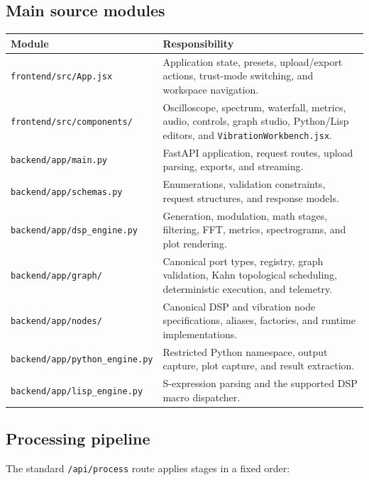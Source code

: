 \documentclass[10pt,a4paper]{article}
\newcommand{\code}[1]{\nolinkurl{#1}}
\begin{document}
\subsection{Main source modules}

\begin{tabularx}{\textwidth}{L{4.1cm}Y}
\toprule
Module & Responsibility\\
\midrule
\code{frontend/src/App.jsx} & Application state, presets, upload/export actions, trust-mode switching, and workspace navigation.\\
\code{frontend/src/components/} & Oscilloscope, spectrum, waterfall, metrics, audio, controls, graph studio, Python/Lisp editors, and \code{VibrationWorkbench.jsx}.\\
\code{backend/app/main.py} & FastAPI application, request routes, upload parsing, exports, and streaming.\\
\code{backend/app/schemas.py} & Enumerations, validation constraints, request structures, and response models.\\
\code{backend/app/dsp_engine.py} & Generation, modulation, math stages, filtering, FFT, metrics, spectrograms, and plot rendering.\\
\code{backend/app/graph/} & Canonical port types, registry, graph validation, Kahn topological scheduling, deterministic execution, and telemetry.\\
\code{backend/app/nodes/} & Canonical DSP and vibration node specifications, aliases, factories, and runtime implementations.\\
\code{backend/app/python_engine.py} & Restricted Python namespace, output capture, plot capture, and result extraction.\\
\code{backend/app/lisp_engine.py} & S-expression parsing and the supported DSP macro dispatcher.\\
\bottomrule
\end{tabularx}

\subsection{Processing pipeline}

The standard \code{/api/process} route applies stages in a fixed order:

\begin{center}
\end{center}
\end{document}
